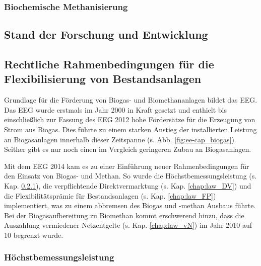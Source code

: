 \subsubsection{Biochemische Methanisierung}\label{chap:biochem} 





\subsection{Stand der Forschung und Entwicklung}


\subsection{Rechtliche Rahmenbedingungen für die Flexibilisierung von Bestandsanlagen}\label{chap:law_theo}

Grundlage für die Förderung von Biogas- und Biomethananlagen bildet das \gls{EEG}. Das \gls{EEG} wurde erstmals im Jahr 2000 in Kraft gesetzt und enthielt bis einschließlich zur Fassung des \gls{EEG} \SI{2012}{\relax} hohe Fördersätze für die Erzeugung von Strom aus Biogas. Dies führte zu einem starken Anstieg der installierten Leistung an Biogasanlagen innerhalb dieser Zeitspanne (s. Abb. \ref{fig:ee-cap_biogas}). Seither gibt es nur noch einen im Vergleich geringeren Zubau an Biogasanlagen. \parencite{DanielGromke2019}\smallskip

Mit dem \gls{EEG} \SI{2014}{\relax} kam es zu einer Einführung neuer Rahmenbedingungen für den Einsatz von Biogas- und Methan. So wurde die Höchstbemessungsleistung (s. Kap. \ref{chap:law_Bem}), die verpflichtende Direktvermarktung (s. Kap. \ref{chap:law_DV}) und die Flexibilitätsprämie für Bestandsanlagen (s. Kap. \ref{chap:law_FP}) implementiert, was zu einem abbremsen des Biogas und -methan Ausbaus führte. Bei der Biogasaufbereitung zu Biomethan kommt erschwerend hinzu, dass die Auszahlung vermiedener Netzentgelte (s. Kap. \ref{chap:law_vN}) im Jahr \SI{2010}{\relax} auf \SI{10}{\Jahre} begrenzt wurde. \parencite{BDEW2019a}


\subsubsection{Höchstbemessungsleistung}\label{chap:law_Bem}

